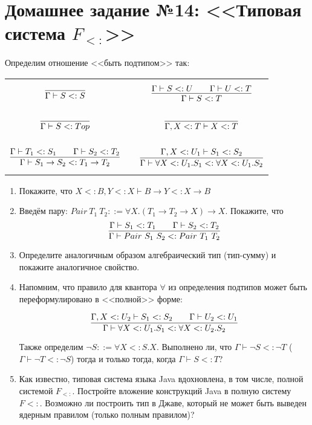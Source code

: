\documentclass[10pt,a4paper,oneside]{article}
\begin{document}
\section*{Домашнее задание №14: <<Типовая система $F_{<:}$>>}
Определим отношение <<быть подтипом>> так:

\begin{center}\begin{tabular}{lp{1cm}l}
$$\infer{\Gamma\vdash S <: S}{}$$&&
$$\infer{\Gamma\vdash S<:T}{\Gamma\vdash S<:U\quad\quad\Gamma\vdash U<:T}$$\\ \\
$$\infer{\Gamma \vdash S <: Top}{}$$&&
$$\infer{\Gamma, X<:T \vdash X<:T}{}$$\\ \\
$$\infer{\Gamma\vdash S_1\rightarrow S_2 <: T_1\rightarrow T_2}{\Gamma\vdash T_1 <: S_1 \quad\quad \Gamma\vdash S_2 <: T_2}$$&&
$$\infer{\Gamma\vdash\forall X <: U_1.S_1 <: \forall X <: U_1.S_2}{\Gamma,X<:U_1\vdash S_1 <: S_2}$$
\end{tabular}\end{center}

\begin{enumerate}
\item Покажите, что $X <: B, Y <: X \vdash B\rightarrow Y <: X \rightarrow B$ 

\item Введём пару: $Pair\ T_1\ T_2 ::= \forall X. (T_1 \rightarrow T_2 \rightarrow X) \rightarrow X$.
Покажите, что $$\infer{\Gamma\vdash Pair\ S_1\ S_2 <: Pair\ T_1\ T_2}{\Gamma\vdash S_1 <: T_1\quad\quad\Gamma\vdash S_2 <: T_2}$$

\item Определите аналогичным образом алгебраический тип (тип-сумму) и покажите аналогичное свойство.

\item Напомним, что правило для квантора $\forall$ из определения подтипов может быть переформулировано в <<полной>> форме:

$$\infer{\Gamma\vdash\forall X <: U_1.S_1 <: \forall X <: U_2.S_2}{\Gamma,X<:U_2\vdash S_1 <: S_2\quad\quad\Gamma\vdash U_2<:U_1}$$

Также определим $\neg S ::= \forall X <: S. X$. Выполнено ли, что
$\Gamma\vdash\neg S <: \neg T$ ($\Gamma\vdash\neg T <: \neg S$) тогда и только тогда, когда
$\Gamma\vdash S <: T$?

\item Как известно, типовая система языка Java вдохновлена, в том числе, полной системой $F_{<:}$. Постройте 
вложение конструкций Java в полную систему $F<:$. Возможно ли построить тип
в Джаве, который не может быть выведен ядерным правилом (только полным правилом)?

\end{enumerate}
\end{document}
